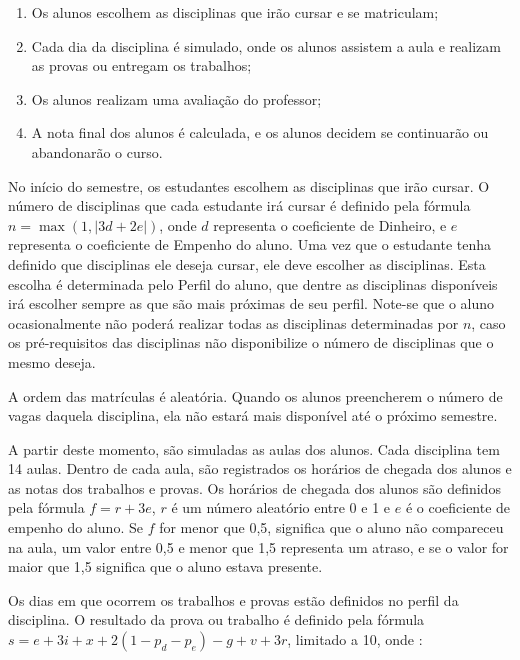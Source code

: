 \begin{enumerate}
  \item Os alunos escolhem as disciplinas que irão cursar e se matriculam;
  \item Cada dia da disciplina é simulado, onde os alunos assistem a aula e realizam as provas ou entregam os trabalhos;
  \item Os alunos realizam uma avaliação do professor;
  \item A nota final dos alunos é calculada, e os alunos decidem se continuarão ou abandonarão o curso.
\end{enumerate}

No início do semestre, os estudantes escolhem as disciplinas que irão cursar. O número de disciplinas que cada estudante irá cursar é definido pela fórmula $ n = \max(1, |3d + 2e|) $, onde $d$ representa o coeficiente de Dinheiro, e $e$ representa o coeficiente de Empenho do aluno. Uma vez que o estudante tenha definido que disciplinas ele deseja cursar, ele deve escolher as disciplinas. Esta escolha é determinada pelo Perfil do aluno, que dentre as disciplinas disponíveis irá escolher sempre as que são mais próximas de seu perfil. Note-se que o aluno ocasionalmente não poderá realizar todas as disciplinas determinadas por $n$, caso os pré-requisitos das disciplinas não disponibilize o número de disciplinas que o mesmo deseja.

A ordem das matrículas é aleatória. Quando os alunos preencherem o número de vagas daquela disciplina, ela não estará mais disponível até o próximo semestre.

A partir deste momento, são simuladas as aulas dos alunos. Cada disciplina tem 14 aulas. Dentro de cada aula, são registrados os horários de chegada dos alunos e as notas dos trabalhos e provas. Os horários de chegada dos alunos são definidos pela fórmula $ f = r + 3e $, $r$ é um número aleatório entre 0 e 1 e $e$ é o coeficiente de empenho do aluno. Se $f$ for menor que 0,5, significa que o aluno não compareceu na aula, um valor entre 0,5 e menor que 1,5 representa um atraso, e se o valor for maior que 1,5 significa que o aluno estava presente.

Os dias em que ocorrem os trabalhos e provas estão definidos no perfil da disciplina. O resultado da prova ou trabalho é definido pela fórmula $ s = e + 3i + x + 2(1 - p_{d} - p_{e}) - g + v + 3r $, limitado a 10, onde :

